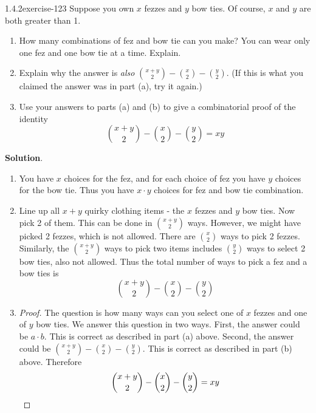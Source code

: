 \documentclass[twoside,11pt,]{book}
\renewcommand{\qedhere}{\relax}
\numberwithin{equation}{chapter}
\begin{document}
\begin{divisionsolution}{1.4.2}{}{exercise-123}%
\hypertarget{p-2073}{}%
Suppose you own \(x\) fezzes and \(y\) bow ties. Of course, \(x\) and \(y\) are both greater than 1.\leavevmode%
\begin{enumerate}[label=(\alph*)]
\item\hypertarget{li-1298}{}\hypertarget{p-2074}{}%
How many combinations of fez and bow tie can you make? You can wear only one fez and one bow tie at a time. Explain.%
\item\hypertarget{li-1299}{}\hypertarget{p-2075}{}%
Explain why the answer is \emph{also} \({x+y \choose 2} - {x \choose 2} - {y \choose 2}\). (If this is what you claimed the answer was in part (a), try it again.)%
\item\hypertarget{li-1300}{}\hypertarget{p-2076}{}%
Use your answers to parts (a) and (b) to give a combinatorial proof of the identity%
\begin{equation*}
{x+y \choose 2} - {x \choose 2} - {y \choose 2} = xy
\end{equation*}
%
\end{enumerate}
%
\par\smallskip%
\noindent\textbf{Solution}.\quad%
\hypertarget{p-2077}{}%
\leavevmode%
\begin{enumerate}[label=(\alph*)]
\item\hypertarget{li-1301}{}\hypertarget{p-2078}{}%
You have \(x\) choices for the fez, and for each choice of fez you have \(y\) choices for the bow tie. Thus you have \(x \cdot y\) choices for fez and bow tie combination.%
\item\hypertarget{li-1302}{}\hypertarget{p-2079}{}%
Line up all \(x+y\) quirky clothing items - the \(x\) fezzes and \(y\) bow ties. Now pick 2 of them. This can be done in \({x+y \choose 2}\) ways. However, we might have picked 2 fezzes, which is not allowed. There are \({x \choose 2}\) ways to pick 2 fezzes. Similarly, the \({x+y \choose 2}\) ways to pick two items includes \({y \choose 2}\) ways to select 2 bow ties, also not allowed. Thus the total number of ways to pick a fez and a bow ties is%
\begin{equation*}
{x+y \choose 2} - {x \choose 2} - {y \choose 2}
\end{equation*}
%
\item\hypertarget{li-1303}{}\begin{proof}{}
\hypertarget{p-2080}{}%
The question is how many ways can you select one of \(x\) fezzes and one of \(y\) bow ties. We answer this question in two ways. First, the answer could be \(a\cdot b\). This is correct as described in part (a) above. Second, the answer could be \({x+y \choose 2} - {x \choose 2} - {y \choose 2}\). This is correct as described in part (b) above. Therefore%
\begin{equation*}
{x+y \choose 2} - {x \choose 2} - {y \choose 2} = xy\qedhere
\end{equation*}
%
\end{proof}
%
\end{enumerate}
%
\end{divisionsolution}%
\end{document}
